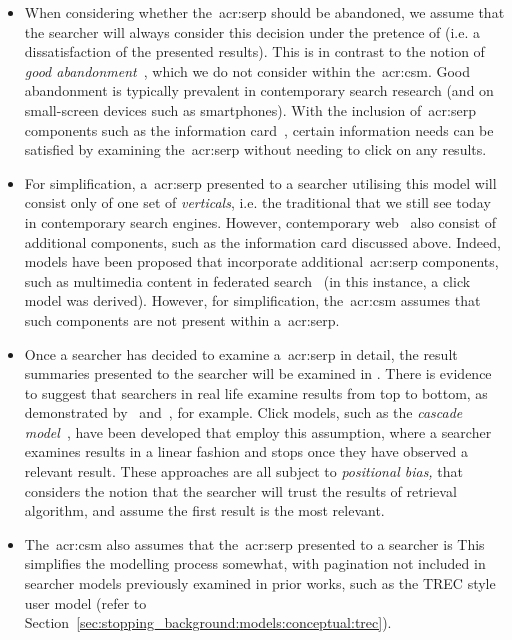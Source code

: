 \begin{itemize}
    \item{When considering whether the~\gls{acr:serp} should be abandoned, we assume that the searcher will always consider this decision under the pretence of  (i.e. a dissatisfaction of the presented results). This is in contrast to the notion of \emph{good abandonment}~\citep{khabsa2016good_abandonment}, which we do not consider within the~\gls{acr:csm}. Good abandonment is typically prevalent in contemporary search research (and on small-screen devices such as smartphones). With the inclusion of~\gls{acr:serp} components such as the information card~\citep{bota2016information_cards}, certain information needs can be satisfied by examining the~\gls{acr:serp} without needing to click on any results.}
    
    \item{For simplification, a~\gls{acr:serp} presented to a searcher utilising this model will consist only of one set of \emph{verticals}, i.e. the traditional  that we still see today in contemporary search engines. However, contemporary web~ also consist of additional components, such as the information card discussed above. Indeed, models have been proposed that incorporate additional~\gls{acr:serp} components, such as multimedia content in federated search~\citep{chen2012federated_search_click_model} (in this instance, a click model was derived). However, for simplification, the~\gls{acr:csm} assumes that such components are not present within a~\gls{acr:serp}.}
    
    \item{Once a searcher has decided to examine a~\gls{acr:serp} in detail, the result summaries presented to the searcher will be examined in . There is evidence to suggest that searchers in real life examine results from top to bottom, as demonstrated by~\cite{joachims2002click_model} and~\cite{joachims2005click_model}, for example. Click models, such as the \emph{cascade model}~\citep{craswell2008click_models}, have been developed that employ this assumption, where a searcher examines results in a linear fashion and stops once they have observed a relevant result. These approaches are all subject to \emph{positional bias,} that considers the notion that the searcher will trust the results of retrieval algorithm, and assume the first result is the most relevant.}
    
    \item{The~\gls{acr:csm} also assumes that the~\gls{acr:serp} presented to a searcher is  This simplifies the modelling process somewhat, with pagination not included in searcher models previously examined in prior works, such as the TREC style user model (refer to Section~\ref{sec:stopping_background:models:conceptual:trec}).}
    
\end{itemize}

